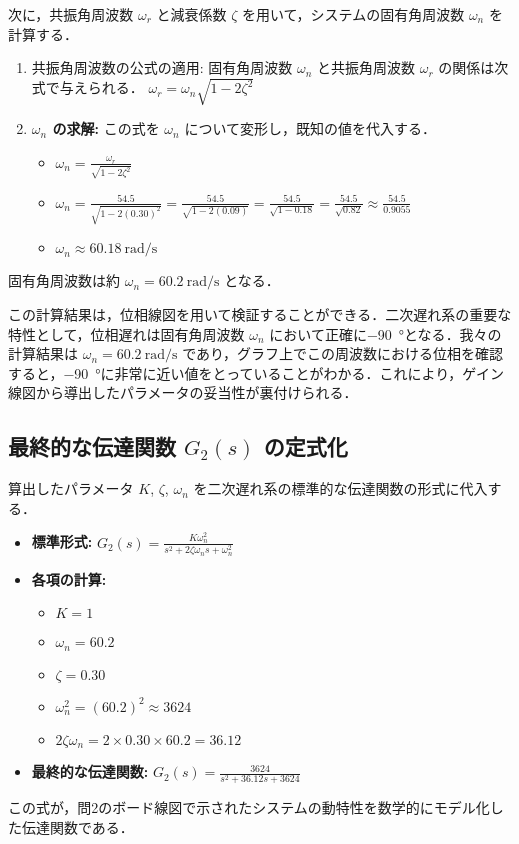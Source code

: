 \documentclass[11pt,a4paper]{ltjsarticle}
\newcommand{\supcite}[1]{\textsuperscript{\cite{#1}}}
\begin{document}
次に，共振角周波数 $\omega_r$ と減衰係数 $\zeta$ を用いて，システムの固有角周波数 $\omega_n$ を計算する．
\begin{enumerate}
    \item 共振角周波数の公式の適用: 固有角周波数 $\omega_n$ と共振角周波数 $\omega_r$ の関係は次式で与えられる．
    $\omega_r = \omega_n \sqrt{1-2\zeta^2}$
    \item \textbf{$\omega_n$ の求解:} この式を $\omega_n$ について変形し，既知の値を代入する．
    \begin{itemize}
        \item $\omega_n = \frac{\omega_r}{\sqrt{1-2\zeta^2}}$
        \item $\omega_n = \frac{54.5}{\sqrt{1-2(0.30)^2}} = \frac{54.5}{\sqrt{1-2(0.09)}} = \frac{54.5}{\sqrt{1-0.18}} = \frac{54.5}{\sqrt{0.82}} \approx \frac{54.5}{0.9055}$
        \item $\omega_n \approx \SI{60.18}{\radian\per\second}$
    \end{itemize}
\end{enumerate}
固有角周波数は約 $\omega_n = \SI{60.2}{\radian\per\second}$ となる．

この計算結果は，位相線図を用いて検証することができる．二次遅れ系の重要な特性として，位相遅れは固有角周波数 $\omega_n$ において正確に\SI{-90}{\degree}となる\supcite{ref7}．我々の計算結果は $\omega_n = \SI{60.2}{\radian\per\second}$ であり，グラフ上でこの周波数における位相を確認すると，\SI{-90}{\degree}に非常に近い値をとっていることがわかる\supcite{ref1}．これにより，ゲイン線図から導出したパラメータの妥当性が裏付けられる．

\subsection{最終的な伝達関数 \texorpdfstring{$G_2(s)$}{G2(s)} の定式化}

算出したパラメータ $K$, $\zeta$, $\omega_n$ を二次遅れ系の標準的な伝達関数の形式に代入する．
\begin{itemize}
    \item \textbf{標準形式:} $G_2(s) = \frac{K\omega_n^2}{s^2 + 2\zeta\omega_n s + \omega_n^2}$
    \item \textbf{各項の計算:}
    \begin{itemize}
        \item $K=1$
        \item $\omega_n = 60.2$
        \item $\zeta = 0.30$
        \item $\omega_n^2 = (60.2)^2 \approx 3624$
        \item $2\zeta\omega_n = 2 \times 0.30 \times 60.2 = 36.12$
    \end{itemize}
    \item \textbf{最終的な伝達関数:}
    $G_2(s) = \frac{3624}{s^2 + 36.12s + 3624}$
\end{itemize}
この式が，問2のボード線図で示されたシステムの動特性を数学的にモデル化した伝達関数である．
\end{document}
